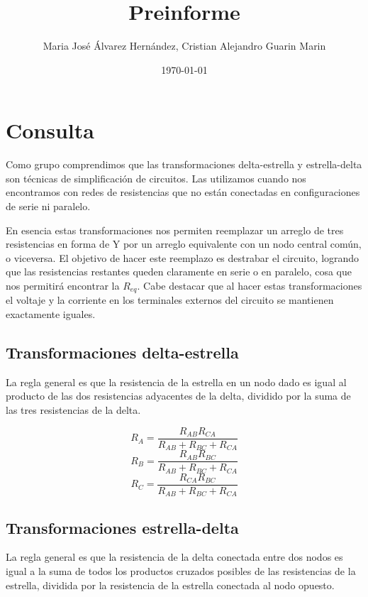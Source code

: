 \documentclass[12pt, a4paper]{article}
\title{\textbf{Preinforme}}
\author{Maria José Álvarez Hernández, Cristian Alejandro Guarin Marin}
\date{\today}
\begin{document}
\maketitle

\section{Consulta}
Como grupo comprendimos que las transformaciones delta-estrella y 
estrella-delta son técnicas de simplificación de circuitos. Las utilizamos 
cuando nos encontramos con redes de resistencias que no están conectadas en 
configuraciones de serie ni paralelo.

En esencia estas transformaciones nos permiten reemplazar un arreglo de
tres resistencias en forma de Y por un arreglo equivalente con un nodo
central común, o viceversa. El objetivo de hacer este reemplazo es destrabar el circuito, logrando que las resistencias restantes queden claramente en serie 
o en paralelo, cosa que nos permitirá encontrar la $R_{eq}$. Cabe destacar
que al hacer estas transformaciones el voltaje y la corriente en los terminales
externos del circuito se mantienen exactamente iguales.

\subsection{Transformaciones delta-estrella}
La regla general es que la resistencia de la estrella en un nodo dado es
igual al producto de las dos resistencias adyacentes de la delta, dividido 
por la suma de las tres resistencias de la delta.

\vspace{0.5cm}
$$R_A = \frac{R_{AB}R_{CA}}{R_{AB}+R_{BC}+R_{CA}}$$
\vspace{0.5cm}
$$R_B = \frac{R_{AB}R_{BC}}{R_{AB}+R_{BC}+R_{CA}}$$
\vspace{0.5cm}
$$R_C = \frac{R_{CA}R_{BC}}{R_{AB}+R_{BC}+R_{CA}}$$

\vspace{0.5cm}

\subsection{Transformaciones estrella-delta}
La regla general es que la resistencia de la delta conectada entre dos nodos
es igual a la suma de todos los productos cruzados posibles de las resistencias
de la estrella, dividida por la resistencia de la estrella conectada al nodo 
opuesto.
\end{document}
